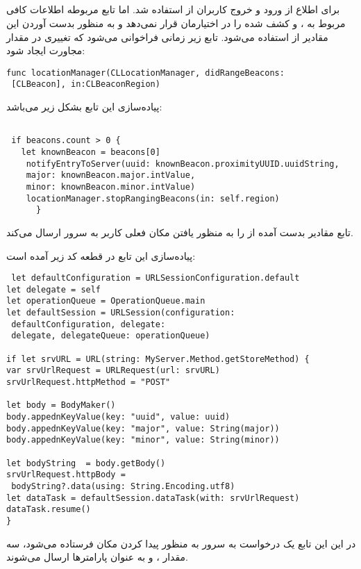 \documentclass[oneside]{report}
\begin{document}
	\subsection{{\small {}}}
برای اطلاع از ورود و خروج کاربران از
						{\normalsize {}}
	استفاده شد. اما تابع مربوطه اطلاعات کافی مربوط به 
			{\normalsize {}}،
					{\normalsize {}}
			و 
					{\normalsize {}}
		کشف شده را در اختیارمان قرار نمی‌دهد و به منظور بدست آوردن این مقادیر از 
				{\normalsize {}}
				استفاده می‌شود. تابع زیر زمانی فراخوانی می‌شود که تغییری در مقدار مجاورت ایجاد شود: 
				\begin{latin}
				\begin{verbatim}
func locationManager(CLLocationManager, didRangeBeacons:
 [CLBeacon], in:CLBeaconRegion)
				\end{verbatim}
				
			\end{latin}		
پیاده‌سازی این تابع بشکل زیر می‌باشد: 
\begin{latin}
	\begin{verbatim}
	
 if beacons.count > 0 {
   let knownBeacon = beacons[0]
    notifyEntryToServer(uuid: knownBeacon.proximityUUID.uuidString, 
    major: knownBeacon.major.intValue, 
    minor: knownBeacon.minor.intValue)
    locationManager.stopRangingBeacons(in: self.region)
      }
	\end{verbatim}
	
\end{latin}		
	تابع 
					{\normalsize {}}
	مقادیر بدست آمده از 
						{\normalsize {}}
						را به منظور یافتن مکان فعلی کاربر به سرور ارسال می‌کند. 
						
						پیاده‌سازی این تابع در قطعه کد زیر آمده است:‌
\begin{latin}
	\begin{verbatim}
 let defaultConfiguration = URLSessionConfiguration.default
let delegate = self
let operationQueue = OperationQueue.main
let defaultSession = URLSession(configuration:
 defaultConfiguration, delegate: 
 delegate, delegateQueue: operationQueue)

if let srvURL = URL(string: MyServer.Method.getStoreMethod) {
var srvUrlRequest = URLRequest(url: srvURL)
srvUrlRequest.httpMethod = "POST"

let body = BodyMaker()
body.appednKeyValue(key: "uuid", value: uuid)
body.appednKeyValue(key: "major", value: String(major))
body.appednKeyValue(key: "minor", value: String(minor))

let bodyString  = body.getBody()
srvUrlRequest.httpBody =
 bodyString?.data(using: String.Encoding.utf8)
let dataTask = defaultSession.dataTask(with: srvUrlRequest)
dataTask.resume()
}
	\end{verbatim}
	
\end{latin}							
در این این تابع یک درخواست 
						{\normalsize {}}
	به سرور به منظور پیدا کردن مکان فرستاده می‌شود، سه مقدار 
							{\normalsize {}}،
																		{\normalsize {}}
																		و 
																								{\normalsize {}}
																								به عنوان پارامتر‌ها ارسال می‌شوند. 
\end{document}
